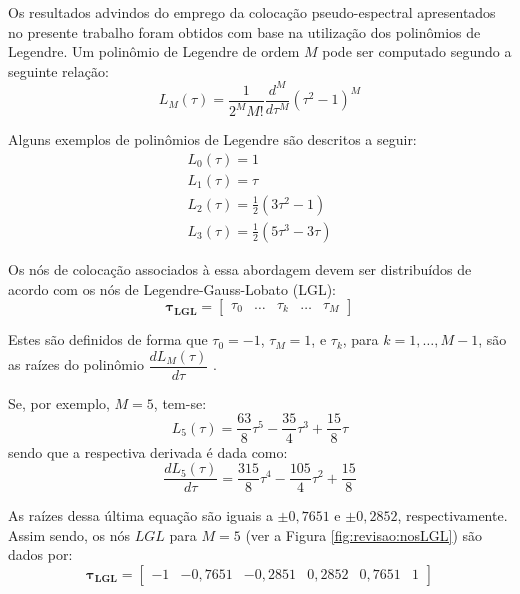 Os resultados advindos do emprego da colocação pseudo-espectral apresentados no presente trabalho foram obtidos com base na utilização dos polinômios de Legendre. Um polinômio de Legendre de ordem $ M $ pode ser computado segundo a seguinte relação:
%
\begin{equation}
	\label{eq:revisao:legendre}
	L_M(\tau)  = \frac{1}{2^M M!} \frac{d^M}{d \tau^M}(\tau^2 - 1)^M
\end{equation}

Alguns exemplos de polinômios de Legendre são descritos a seguir:
%
\begin{equation}
	\label{eq:revisao:ExLegendre}
	\begin{gathered}
		L_0(\tau) = 1 \\
		L_1(\tau) = \tau \\
		L_2(\tau) = \frac{1}{2} (3 \tau^2 - 1) \\
		L_3(\tau) = \frac{1}{2} (5 \tau^3 - 3\tau)
	\end{gathered}
\end{equation}

Os nós de colocação associados à essa abordagem devem ser distribuídos de acordo com os nós de Legendre-Gauss-Lobato (LGL): 
%
\begin{equation}
{\bm \tau_\mathbf{LGL}} = \begin{bmatrix} \tau_0 & \dots & \tau_k & \dots & \tau_M \end{bmatrix}
\end{equation}
%

Estes são definidos de forma que $ \tau_0 = -1$, $ \tau_M = 1 $, e $ \tau_k $, para $ k = 1, \dots, M-1 $, são as raízes do polinômio $ \dfrac{dL_M(\tau)}{d\tau} $ \cite{becerra_tutorial_2010}.

Se, por exemplo, $ M = 5 $, tem-se:
%
\begin{equation}
	L_5(\tau) = \frac{63}{8} \tau^5 - \frac{35}{4} \tau^3 + \frac{15}{8} \tau 
\end{equation}
% 
sendo que a respectiva derivada é dada como:
%
\begin{equation}
	\label{eq:revisao:dL5}
	\frac{dL_5(\tau)}{d\tau} = \frac{315}{8} \tau^4 - \frac{105}{4} \tau^2 + \frac{15}{8}  
\end{equation}

As raízes dessa última equação são iguais a $ \pm 0,7651 $ e $ \pm 0,2852 $, respectivamente. Assim sendo, os nós $ LGL $ para $ M = 5 $ (ver a Figura \ref{fig:revisao:nosLGL}) são dados por:
%
\begin{equation}
	\label{eq:revisao:nosLGL5}
	{\bm \tau_\mathbf{LGL}} = \begin{bmatrix} -1 & -0,7651 & -0,2851 & 0,2852 & 0,7651 & 1 \end{bmatrix} 
\end{equation}

